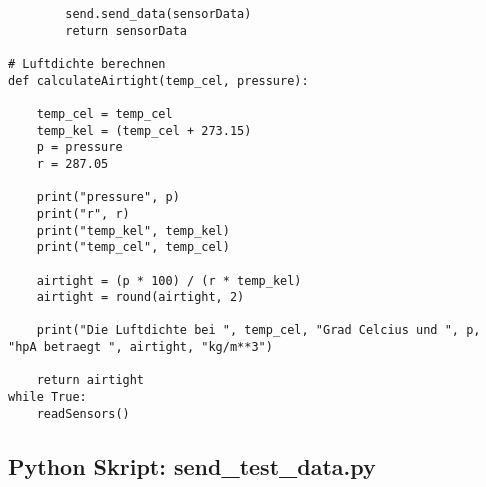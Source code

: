 \begin{lstlisting}
        send.send_data(sensorData)
        return sensorData

# Luftdichte berechnen
def calculateAirtight(temp_cel, pressure):

    temp_cel = temp_cel
    temp_kel = (temp_cel + 273.15)
    p = pressure
    r = 287.05

    print("pressure", p)
    print("r", r)
    print("temp_kel", temp_kel)
    print("temp_cel", temp_cel)

    airtight = (p * 100) / (r * temp_kel)
    airtight = round(airtight, 2)

    print("Die Luftdichte bei ", temp_cel, "Grad Celcius und ", p, "hpA betraegt ", airtight, "kg/m**3")

    return airtight
while True:
    readSensors()
\end{lstlisting}

\subsection{Python Skript: send\_test\_data.py}

